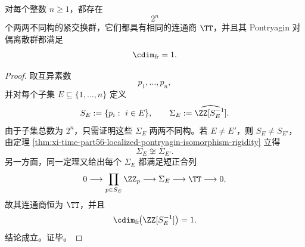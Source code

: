 \begin{corollary}[单圆维下的指数级局部化多样性]\label{cor:xi-time-part56-single-circle-dimension-exponential-diversity}
对每个整数 \(n\ge 1\)，都存在
\[
2^n
\]
个两两不同构的紧交换群，它们都具有相同的连通商 \(\TT\)，并且其 Pontryagin 对偶离散群都满足
\[
\cdim_{\mathrm{fr}}=1.
\]
\end{corollary}
\begin{proof}
取互异素数
\[
p_1,\dots,p_n,
\]
并对每个子集 \(E\subseteq\{1,\dots,n\}\) 定义
\[
S_E:=\{p_i:\ i\in E\},
\qquad
\Sigma_E:=\widehat{\ZZ[S_E^{-1}]}.
\]
由于子集总数为 \(2^n\)，只需证明这些 \(\Sigma_E\) 两两不同构。若 \(E\neq E'\)，则 \(S_E\neq S_{E'}\)，由定理 \ref{thm:xi-time-part56-localized-pontryagin-isomorphism-rigidity} 立得
\[
\Sigma_E\not\cong \Sigma_{E'}.
\]
另一方面，同一定理又给出每个 \(\Sigma_E\) 都满足短正合列
\[
0\longrightarrow \prod_{p\in S_E}\ZZ_p
\longrightarrow \Sigma_E
\longrightarrow \TT
\longrightarrow 0,
\]
故其连通商恒为 \(\TT\)，并且
\[
\cdim_{\mathrm{fr}}\!\bigl(\ZZ[S_E^{-1}]\bigr)=1.
\]
结论成立。证毕。
\end{proof}

